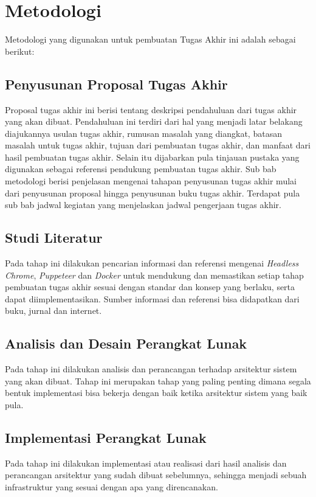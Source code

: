 	\section{Metodologi}
		Metodologi yang digunakan untuk pembuatan Tugas Akhir ini adalah sebagai berikut:	
		\subsection{Penyusunan Proposal Tugas Akhir}
			Proposal tugas akhir ini berisi tentang deskripsi pendahuluan dari tugas
			akhir yang akan dibuat. Pendahuluan ini terdiri dari hal yang menjadi latar
			belakang diajukannya usulan tugas akhir, rumusan masalah yang diangkat,
			batasan masalah untuk tugas akhir, tujuan dari pembuatan tugas akhir, dan
			manfaat dari hasil pembuatan tugas akhir. Selain itu dijabarkan pula tinjauan
			pustaka yang digunakan sebagai referensi pendukung pembuatan tugas akhir.
			Sub bab metodologi berisi penjelasan mengenai tahapan penyusunan tugas
			akhir mulai dari penyusunan proposal hingga penyusunan buku tugas akhir.
			Terdapat pula sub bab jadwal kegiatan yang menjelaskan jadwal pengerjaan
			tugas akhir.	
		\subsection{Studi Literatur}
			Pada tahap ini dilakukan pencarian informasi dan referensi mengenai \textit{Headless Chrome}, \textit{Puppeteer} dan \textit{Docker} untuk mendukung dan memastikan setiap tahap pembuatan tugas akhir sesuai dengan standar dan konsep yang berlaku, serta dapat diimplementasikan. Sumber informasi dan referensi bisa didapatkan dari buku, jurnal dan internet.
		\subsection{Analisis dan Desain Perangkat Lunak}
			Pada tahap ini dilakukan analisis dan perancangan terhadap arsitektur sistem yang akan dibuat. Tahap ini merupakan tahap yang paling penting dimana segala bentuk implementasi bisa bekerja dengan baik ketika arsitektur sistem yang baik pula.
		\subsection{Implementasi Perangkat Lunak}
			Pada tahap ini dilakukan implementasi atau realisasi dari hasil analisis dan perancangan arsitektur yang sudah dibuat sebelumnya, sehingga menjadi sebuah infrastruktur yang sesuai dengan apa yang direncanakan. 
